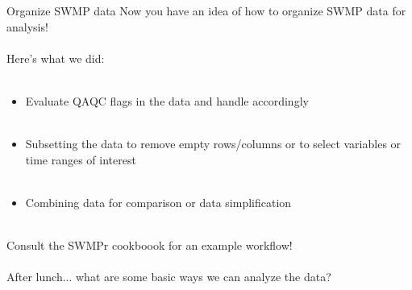 \documentclass[xcolor=svgnames]{beamer}\usepackage[]{graphicx}\usepackage[]{color}
\newcommand{\Bigtxt}[1]{\textbf{\textit{#1}}}
\begin{document}
\begin{frame}[containsverbatim]{Organize SWMP data}
Now you have an idea of how to organize SWMP data for analysis!\\~\\
Here's what we did:\\~\\
\begin{itemize}
\item Evaluate QAQC flags in the data and handle accordingly \\~\\
\item Subsetting the data to remove empty rows/columns or to select variables or time ranges of interest \\~\\
\item Combining data for comparison or data simplification \\~\\
\end{itemize}
Consult the SWMPr cookboook for an example workflow! \\~\\
After lunch... what are some basic ways we can analyze the data?
\end{frame}

\end{document}
